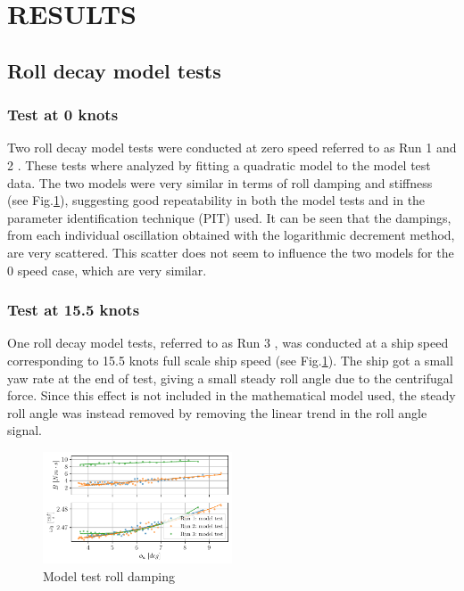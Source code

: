 \section*{RESULTS}\label{results}
\subsection*{Roll decay model tests}\label{roll-decay-model-tests}
\subsubsection*{Test at 0 knots}\label{test-at-0-knots}
Two roll decay model tests were conducted at zero speed referred to as
Run 1 and 2 \citep{7505983/5DP3HN8F}.
These tests where analyzed by fitting a quadratic model
to the model test data. The two models were very similar in terms of
roll damping and stiffness (see Fig.\ref{fig:mdl}), suggesting
good repeatability in both the model tests and in the parameter
identification technique (PIT) used. It can be seen that the dampings,
from each individual oscillation obtained with the logarithmic decrement
method, are very scattered. This scatter does not seem to influence the
two models for the 0 speed case, which are very similar.
\subsubsection*{Test at 15.5 knots}\label{test-at-15.5-knots}
One roll decay model tests, referred to as Run 3
\citep{7505983/5DP3HN8F}, was conducted at a ship speed corresponding to
15.5 knots full scale ship speed (see Fig.\ref{fig:mdl}). The
ship got a small yaw rate
at the end of test, giving a small steady roll angle due to the
centrifugal force. Since this effect is not included in the mathematical
model used, the steady roll angle was instead removed by removing the
linear trend in the roll angle signal.
\begin{figure}[H]
\begin{center}\includegraphics[width = 0.5\textwidth]{figures/mdl.pdf}\end{center}
\vspace{-1cm}
\caption{Model test roll damping}
\label{fig:mdl}
\end{figure}
